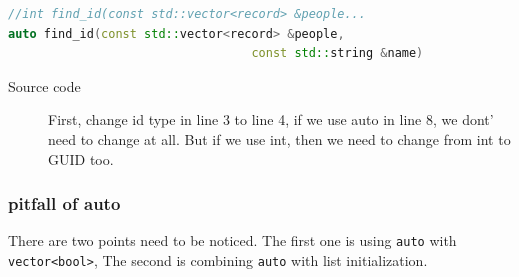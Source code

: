 \documentclass[a4paper,11pt,twoside]{book}
\begin{document}
\begin{itemize}
\begin{enumerate}
\begin{lstlisting}[frame=single, language=c++, mathescape=true]
//int find_id(const std::vector<record> &people...
auto find_id(const std::vector<record> &people, 
                                  const std::string &name)
\end{lstlisting}
\begin{description}
	\item[Source code] First, change id type in line 3 to line 4, if we use auto in line 8, we dont' need to change at all. But if we use int, then we need to change from int to GUID too.
\end{description}

	\end{enumerate}
\end{itemize}
	
\subsubsection{pitfall of auto}
	There are two points need to be noticed. The first one is using \texttt{auto} with \texttt{vector<bool>}, The second is combining \texttt{auto} with list initialization.
\end{document}
